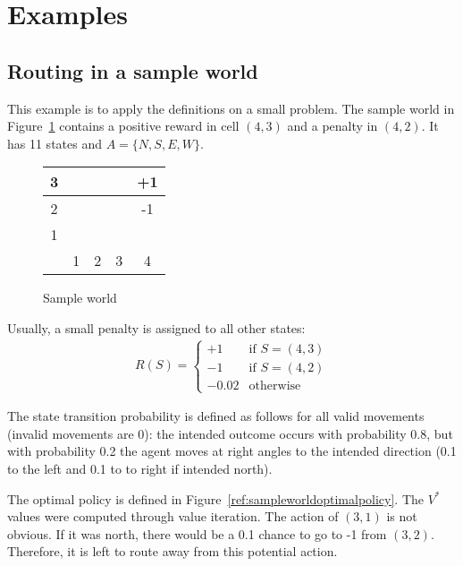 \documentclass{report}
\begin{document}
\section{Examples}
\subsection{Routing in a sample world}
This example is to apply the definitions on a small problem. The sample world in Figure~\ref{ref:sampleworld} contains a positive reward in cell $(4, 3)$ and a penalty in $(4, 2)$. It has 11 states and $A = \{N, S, E, W\}$.
\begin{figure}[h!]
\centering
\begin{tabular}{c|c|c|c|c|}
\hline
3 & & & & +1 \\
\hline
2 & & \cellcolor{black} & & -1 \\
\hline
1 & & & & \\
\hline
& 1 & 2 & 3 & 4 \\
\end{tabular}
\caption{Sample world}
\label{ref:sampleworld}
\end{figure}

Usually, a small penalty is assigned to all other states:
\begin{align*}
R(S)=
\left\{
\begin{array}{ll}
+1 & \mbox{if } S = (4,3) \\
-1  & \mbox{if } S = (4,2) \\
-0.02 & \mbox{otherwise}
\end{array}
\right.
\end{align*}

The state transition probability is defined as follows for all valid movements (invalid movements are 0): the intended outcome occurs with probability 0.8, but with probability 0.2 the agent moves at right angles to the intended direction (0.1 to the left and 0.1 to to right if intended north).

The optimal policy is defined in Figure~\ref{ref:sampleworldoptimalpolicy}.
The $V^{*}$ values were computed through value iteration.
The action of $(3, 1)$ is not obvious. If it was north, there would be a 0.1 chance to go to -1 from $(3, 2)$.
Therefore, it is left to route away from this potential action.
\end{document}
